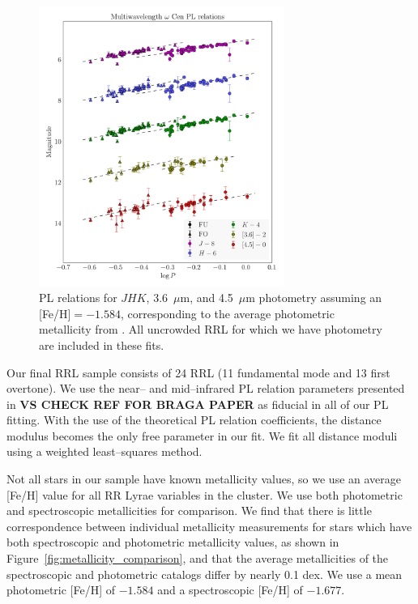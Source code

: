 \documentclass[a4paper,fleqn,usenatbib]{mnras}
\begin{document}
\begin{figure}
\begin{center}
\includegraphics[width=80mm]{final_plots/multiwavelength_PL_allstars_phot.pdf}
\caption{PL relations for $J\!H\!K$, 3.6~$\mu$m, and 4.5~$\mu$m photometry assuming an [Fe/H]$=-1.584$, corresponding to the average photometric metallicity from \citet{2000AJ....119.1824R}. All uncrowded RRL for which we have photometry are included in these fits.}
\label{fig:omegaCen_pl_allstars}
\end{center}
\end{figure}


Our final RRL sample consists of 24 RRL (11 fundamental mode and 13 first overtone). We use the near-- and mid--infrared PL relation parameters presented in {\bf VS CHECK REF FOR BRAGA PAPER} as fiducial in all of our PL fitting. With the use of the theoretical PL relation coefficients, the distance modulus becomes the only free parameter in our fit. We fit all distance moduli using a weighted least--squares method.

Not all stars in our sample have known metallicity values, so we use an average [Fe/H] value for all RR Lyrae variables in the cluster. We use both photometric \citep{2000AJ....119.1824R} and spectroscopic \citep{2006ApJ...640L..43S} metallicities for comparison. We find that there is little correspondence between individual metallicity measurements for stars which have both spectroscopic and photometric metallicity values, as shown in Figure~\ref{fig:metallicity_comparison}, and that the average metallicities of the spectroscopic and photometric catalogs differ by nearly 0.1 dex. We use a mean photometric [Fe/H] of  $-1.584$ and a spectroscopic [Fe/H] of $-1.677$.
\end{document}
